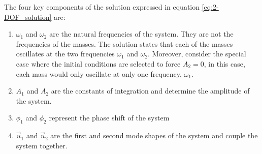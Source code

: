 \documentclass[12pt,letter]{article}
\begin{document}
	\pagebreak
	\noindent The four key components of the solution expressed in equation \ref{eq:2-DOF_solution} are:
	\begin{enumerate}
	\item $\omega_1$ and $\omega_2$ are the natural frequencies of the system. They are not the frequencies of the masses. The solution states that each of the masses oscillates at the two frequencies $\omega_1$ and $\omega_2$. Moreover, consider the special case where the initial conditions are selected to force $A_2 = 0$, in this case, each mass would only oscillate at only one frequency, $\omega_1$.
	\item $A_1$ and $A_2$ are the constants of integration and determine the amplitude of the system.
	\item $\phi_1$ and $\phi_2$ represent the phase shift of the system
	\item $\vec{u}_1$ and $\vec{u}_2$ are the first and second mode shapes of the system and couple the system together.
	\end{enumerate}
	
\end{document}
